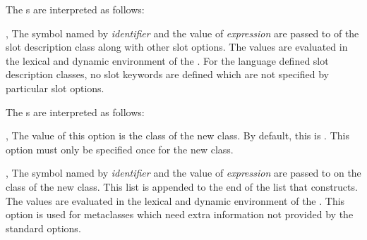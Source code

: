 \begin{optDefinition}
\noindent
The \/s are interpreted as follows:
\begin{options}
    \item[\scref{identifier}, \scref{level-1-form}]%
    The symbol named by {\em identifier} and the value of {\em expression} are
    passed to  of the slot description class along with other
    slot options.  The values are evaluated in the lexical and dynamic
    environment of the .  For the language defined slot
    description classes, no slot keywords are defined which are not specified by
    particular  slot options.
\end{options}
%
The \/s are interpreted as follows:
\begin{options}
    \item[\keyworddef{class}, \scref{class-name}]%
    The value of this option is the class of the new class.  By default, this is
    .  This option must only be specified once for the new
    class.

    \item[\scref{identifier}, \scref{level-1-form}]%
    The symbol named by {\em identifier} and the value of {\em expression} are
    passed to  on the class of the new class.  This list is
    appended to the end of the list that  constructs.  The
    values are evaluated in the lexical and dynamic environment of the
    .  This option is used for metaclasses which need extra
    information not provided by the standard options.
\end{options}
%
\end{optDefinition}


